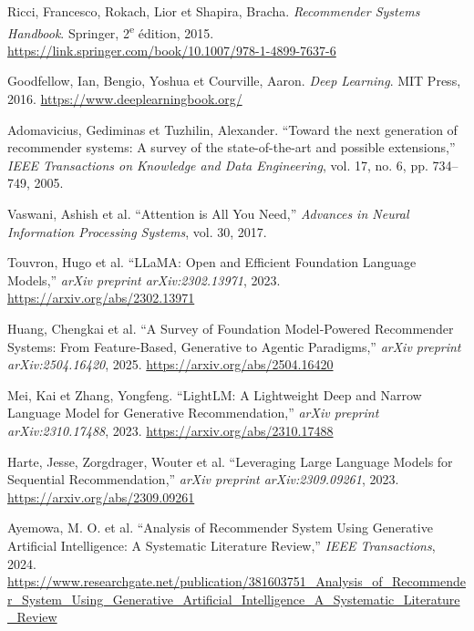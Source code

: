 \begin{thebibliography}{99}

Ricci, Francesco, Rokach, Lior et Shapira, Bracha. 
\textit{Recommender Systems Handbook}. 
Springer, 2\textsuperscript{e} édition, 2015. \url{https://link.springer.com/book/10.1007/978-1-4899-7637-6}

Goodfellow, Ian, Bengio, Yoshua et Courville, Aaron. 
\textit{Deep Learning}. 
MIT Press, 2016. \url{https://www.deeplearningbook.org/}

Adomavicius, Gediminas et Tuzhilin, Alexander.
``Toward the next generation of recommender systems: A survey of the state-of-the-art and possible extensions,'' 
\textit{IEEE Transactions on Knowledge and Data Engineering}, vol. 17, no. 6, pp. 734--749, 2005.

Vaswani, Ashish et al. 
``Attention is All You Need,'' 
\textit{Advances in Neural Information Processing Systems}, vol. 30, 2017.

Touvron, Hugo et al. 
``LLaMA: Open and Efficient Foundation Language Models,'' 
\textit{arXiv preprint arXiv:2302.13971}, 2023. \url{https://arxiv.org/abs/2302.13971}

Huang, Chengkai et al.  
``A Survey of Foundation Model‑Powered Recommender Systems: From Feature‑Based, Generative to Agentic Paradigms,'' 
\textit{arXiv preprint arXiv:2504.16420}, 2025. \url{https://arxiv.org/abs/2504.16420}

Mei, Kai et Zhang, Yongfeng.  
``LightLM: A Lightweight Deep and Narrow Language Model for Generative Recommendation,'' 
\textit{arXiv preprint arXiv:2310.17488}, 2023. \url{https://arxiv.org/abs/2310.17488}

Harte, Jesse, Zorgdrager, Wouter et al.  
``Leveraging Large Language Models for Sequential Recommendation,'' 
\textit{arXiv preprint arXiv:2309.09261}, 2023. \url{https://arxiv.org/abs/2309.09261}

Ayemowa, M. O. et al.  
``Analysis of Recommender System Using Generative Artificial Intelligence: A Systematic Literature Review,'' 
\textit{IEEE Transactions}, 2024. \url{https://www.researchgate.net/publication/381603751_Analysis_of_Recommender_System_Using_Generative_Artificial_Intelligence_A_Systematic_Literature_Review}


\end{thebibliography}
